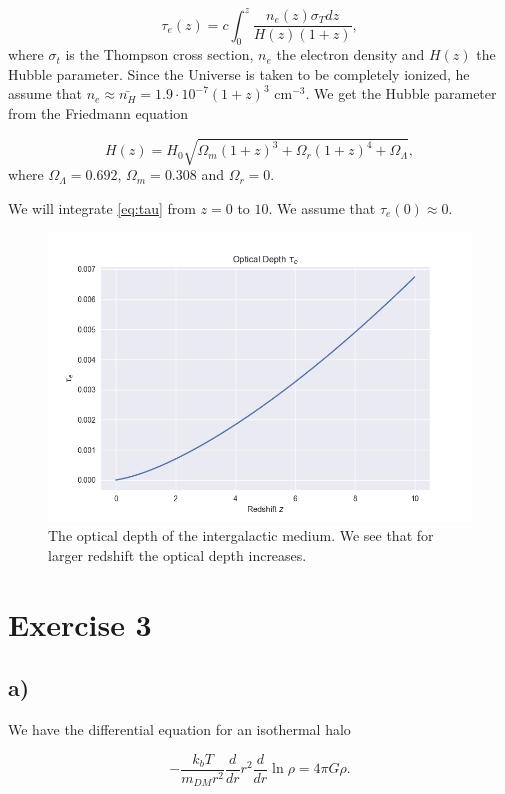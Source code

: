 \documentclass[a4paper,norsk, 10pt]{article}
\begin{document}
\begin{equation}\label{eq:tau}
\tau_e(z) = c\int_0^z \frac{n_e(z) \sigma_T dz}{H(z)(1+z)},
\end{equation}
where $\sigma_t$ is the Thompson cross section, $n_e$ the electron density and $H(z)$ the Hubble parameter. Since the Universe is taken to be completely ionized, he assume that $n_e \approx \bar{n_H} = 1.9 \cdot 10^{-7} (1+z)^3 $ cm$^{-3}$. We get the Hubble parameter from the Friedmann equation

\begin{equation}
H(z) = H_0 \sqrt{\Omega_m (1+z)^3 + \Omega_r(1+z)^4 + \Omega_{\Lambda}},
\end{equation}
where $\Omega_{\Lambda} = 0.692$, $\Omega_m = 0.308$ and $\Omega_r = 0$.

We will integrate \eqref{eq:tau} from $z=0$ to $10$. We assume that $\tau_e(0) \approx 0$.


\begin{figure}[H]
\centering
\includegraphics[scale=0.7]{tau}
\caption{The optical depth of the intergalactic medium. We see that for larger redshift the optical depth increases.}
\end{figure}


\section{Exercise 3}
\subsection{a)}
We have the differential equation for an isothermal halo

\begin{equation}\label{eq:diff}
-\dfrac{k_b T}{m_{DM} r^2}\dfrac{d}{dr}r^2 \dfrac{d}{dr} \ln \rho = 4 \pi G\rho.
\end{equation}
\end{document}
